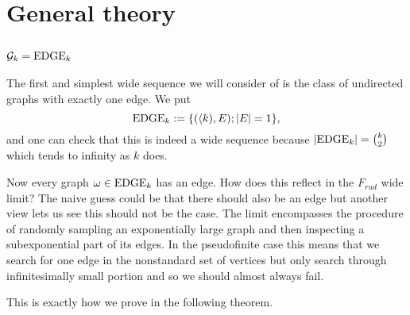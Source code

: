 \chapter{General theory}\label{chapgeneraltheory}
\section{\texorpdfstring{$\mathcal{G}_k=\text{EDGE}_k$}{Gk=EDGEk}}
The first and simplest wide sequence we will consider of is the class of undirected graphs with exactly one edge. We put
\[\text{EDGE}_k:=\{\text{$(\langle k),E); \left|{E}\right|=1$}\},\]
and one can check that this is indeed a wide sequence because $\left|{\text{EDGE}_k}\right|=\binom{k}{2}$ which tends to infinity as $k$ does.

Now every graph $\omega\in\text{EDGE}_k$ has an edge. How does this reflect in the $F_{rud}$ wide limit? The naive guess could be that there should also be an edge but another view lets us see this should not be the case. The limit encompasses the procedure of randomly sampling an exponentially large graph and then inspecting a subexponential part of its edges. In the pseudofinite case this means that we search for one edge in the nonstandard set of vertices but only search through infinitesimally small portion and so we should almost always fail.

This is exactly how we prove in the following theorem.

